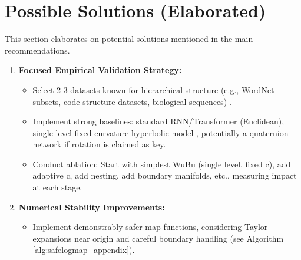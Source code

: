 \documentclass[11pt]{article}
\begin{document}
\section{Possible Solutions (Elaborated)}
\label{app:possible_solutions}

This section elaborates on potential solutions mentioned in the main recommendations.

\begin{enumerate}[noitemsep]
    \item \textbf{Focused Empirical Validation Strategy:}
    \begin{itemize}[noitemsep]
        \item Select 2-3 datasets known for hierarchical structure (e.g., WordNet subsets, code structure datasets, biological sequences) \cite{NickelKiela2017}.
        \item Implement strong baselines: standard RNN/Transformer (Euclidean), single-level fixed-curvature hyperbolic model \cite{GaneaEtAl2018}, potentially a quaternion network if rotation is claimed as key.
        \item Conduct ablation: Start with simplest WuBu (single level, fixed c), add adaptive c, add nesting, add boundary manifolds, etc., measuring impact at each stage.
    \end{itemize}

    \item \textbf{Numerical Stability Improvements:}
    \begin{itemize}[noitemsep]
        \item Implement demonstrably safer map functions, considering Taylor expansions near origin and careful boundary handling (see Algorithm \ref{alg:safelogmap_appendix}).


\end{itemize}
\end{enumerate}
\end{document}

